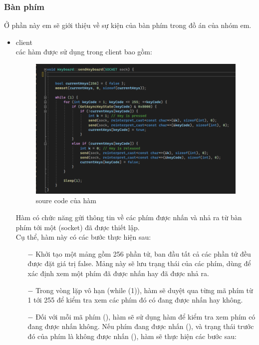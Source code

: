 \subsubsection{Bàn phím}
Ở phần này em sẽ giới thiệu về sự kiện của bàn phím trong đồ án của nhóm em.
\begin{itemize}
    \item client \\
    các hàm được sử dụng trong client bao gồm: \\
    \begin{figure}[H]
    \begin{center}
    \includegraphics[scale=0.8]{img/sendKeyboard.png}
    \caption{soure code của hàm \textbf{}}
    \end{center}
    \end{figure}
    Hàm \textbf{} có chức năng gửi thông tin về các phím được nhấn và nhả ra từ bàn phím tới một \textbf{} (socket) đã được thiết lập.\\
    Cụ thể, hàm này có các bước thực hiện sau:
    \begin{itemize}
    \item[$-$] Khởi tạo một mảng  \textbf{} gồm 256 phần tử, ban đầu tất cả các phần tử đều được đặt giá trị false. Mảng này sẽ lưu trạng thái của các phím, dùng để xác định xem một phím đã được nhấn hay đã được nhả ra.
    \item[$-$] Trong vòng lặp vô hạn (while (1)), hàm sẽ duyệt qua từng mã phím từ 1 tới 255 để kiểm tra xem các phím đó có đang được nhấn hay không.
    \item[$-$] Đối với mỗi mã phím (\textbf{}), hàm sẽ sử dụng hàm \textbf{} để kiểm tra xem phím có đang được nhấn không. Nếu phím đang được nhấn (\textbf{}), và trạng thái trước đó của phím là không được nhấn (\textbf{}), hàm sẽ thực hiện các bước sau:\\

\end{itemize}
\end{itemize}
